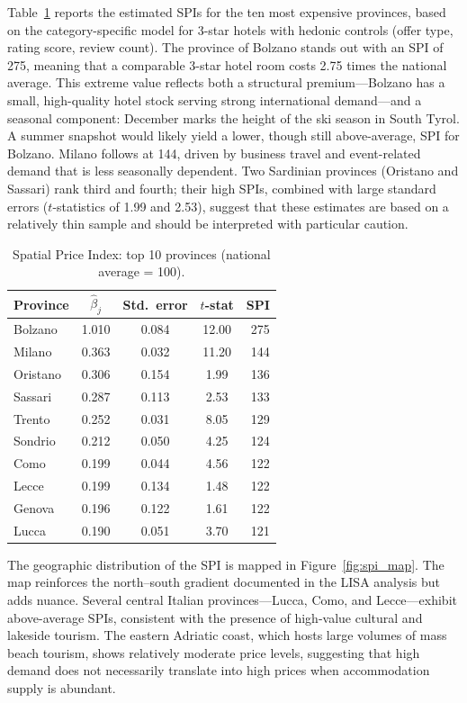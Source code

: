 \documentclass[12pt,a4paper]{article}
\begin{document}
Table~\ref{tab:spi} reports the estimated SPIs for the ten most expensive provinces, based on the category-specific model for 3-star hotels with hedonic controls (offer type, rating score, review count). The province of Bolzano stands out with an SPI of 275, meaning that a comparable 3-star hotel room costs 2.75 times the national average. This extreme value reflects both a structural premium---Bolzano has a small, high-quality hotel stock serving strong international demand---and a seasonal component: December marks the height of the ski season in South Tyrol. A summer snapshot would likely yield a lower, though still above-average, SPI for Bolzano. Milano follows at 144, driven by business travel and event-related demand that is less seasonally dependent. Two Sardinian provinces (Oristano and Sassari) rank third and fourth; their high SPIs, combined with large standard errors ($t$-statistics of 1.99 and 2.53), suggest that these estimates are based on a relatively thin sample and should be interpreted with particular caution.

\begin{table}[H]
\centering
\caption{Spatial Price Index: top 10 provinces (national average = 100).}
\label{tab:spi}
\begin{tabular}{lcccr}
\toprule
\textbf{Province} & \textbf{$\hat{\beta}_j$} & \textbf{Std.\ error} & \textbf{$t$-stat} & \textbf{SPI} \\
\midrule
Bolzano  & 1.010 & 0.084 & 12.00 & 275 \\
Milano   & 0.363 & 0.032 & 11.20 & 144 \\
Oristano & 0.306 & 0.154 &  1.99 & 136 \\
Sassari  & 0.287 & 0.113 &  2.53 & 133 \\
Trento   & 0.252 & 0.031 &  8.05 & 129 \\
Sondrio  & 0.212 & 0.050 &  4.25 & 124 \\
Como     & 0.199 & 0.044 &  4.56 & 122 \\
Lecce    & 0.199 & 0.134 &  1.48 & 122 \\
Genova   & 0.196 & 0.122 &  1.61 & 122 \\
Lucca    & 0.190 & 0.051 &  3.70 & 121 \\
\bottomrule
\end{tabular}
\end{table}

The geographic distribution of the SPI is mapped in Figure~\ref{fig:spi_map}. The map reinforces the north--south gradient documented in the LISA analysis but adds nuance. Several central Italian provinces---Lucca, Como, and Lecce---exhibit above-average SPIs, consistent with the presence of high-value cultural and lakeside tourism. The eastern Adriatic coast, which hosts large volumes of mass beach tourism, shows relatively moderate price levels, suggesting that high demand does not necessarily translate into high prices when accommodation supply is abundant.
\end{document}
